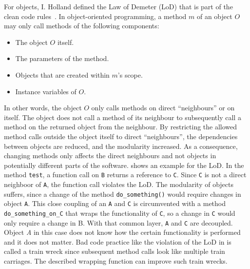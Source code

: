 For objects, I. Holland defined the Law of Demeter (LoD) that is part of the clean code rules~\cite{lieberherr_assuring_1989}.
In object-oriented programming, a method $m$ of an object $O$ may only call methods of the following components:
\begin{itemize}
    \item The object $O$ itself.
    \item The parameters of the method.
    \item Objects that are created within $m$'s scope.
    \item Instance variables of $O$.
\end{itemize}
In other words, the object $O$ only calls methods on direct \enquote{neighbours} or on itself. The object does not call a method of its neighbour to subsequently call a method on the returned object from the neighbour. By restricting the allowed method calls outside the object itself to direct \enquote{neighbours}, the dependencies between objects are reduced, and the modularity increased. As a consequence, changing methods only affects the direct neighbours and not objects in potentially different parts of the software. 
 shows an example for the LoD. In the method \texttt{test}, a function call on \texttt{B} returns a reference to \texttt{C}. Since \texttt{C} is not a direct neighboor of \texttt{A}, the function call violates the LoD. The modularity of objects suffers, since a change of the method \texttt{do\_something()} would require changes in object \texttt{A}. This close coupling of an \texttt{A} and \texttt{C} is circumvented with a method \texttt{do\_something\_on\_C} that wraps the functionality of \texttt{C}, so a change in \texttt{C} would only require a change in B. With that common layer, \texttt{A} and \texttt{C} are decoupled. Object \textit{A} in this case does not know how the certain functionality is performed and it does not matter.  
Bad code practice like the violation of the LoD in  is called a train wreck since subsequent method calls look like multiple train carriages. The described wrapping function can improve such train wrecks.

